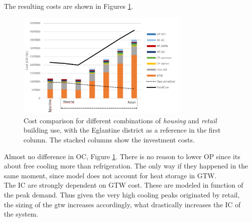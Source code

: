 \documentclass{article}
\begin{document}
The resulting costs are shown in Figures \ref{fig:CU_TC}. 

\begin{figure}[htp]
	\centering
	\includegraphics[width=0.75\textwidth]{CU_SA_TC.png}
	\caption{Cost comparison for different combinations of \textit{housing} and \textit{retail} building use, with the Eglantine district as a reference in the first column. The stacked columns show the investment costs.}
	\label{fig:CU_TC}
\end{figure}

Almost no difference in OC, Figure \ref{fig:CU_TC}.
There is no reason to lower OP since its about free cooling more than refrigeration. The only way if they happened in the same moment, since model does not account for heat storage in GTW.\\

The IC are strongly dependent on GTW cost. These are modeled in function of the peak demand. Thus given the very high cooling peaks originated by retail, the sizing of the gtw increases accordingly, what drastically increases the IC of the system. \\\\
\end{document}

